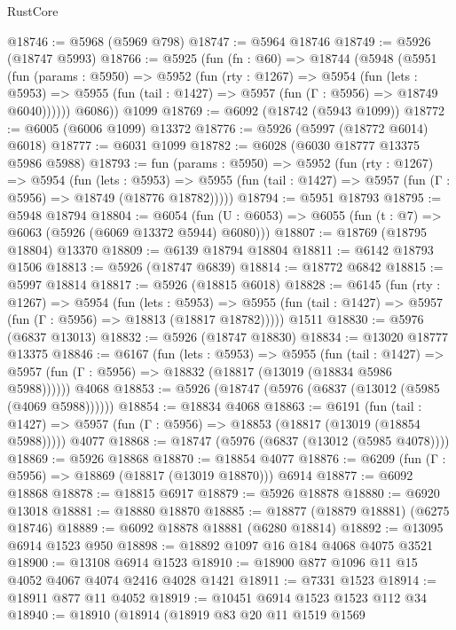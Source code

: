 \begin{lexlean}{RustCore}
\begin{coremodule}
@18746 := @5968 (@5969 @798)
@18747 := @5964 @18746
@18749 := @5926 (@18747 @5993)
@18766 := @5925
    (fun (fn : @60) =>
    @18744
      (@5948
        (@5951
          (fun (params : @5950) =>
          @5952
            (fun (rty : @1267) =>
            @5954
              (fun (lets : @5953) =>
              @5955 (fun (tail : @1427) => @5957 (fun (Γ : @5956) => @18749 @6040))))))
        @6086))
    @1099
@18769 := @6092 (@18742 (@5943 @1099))
@18772 := @6005 (@6006 @1099) @13372
@18776 := @5926 (@5997 (@18772 @6014) @6018)
@18777 := @6031 @1099
@18782 := @6028 (@6030 @18777 @13375 @5986 @5988)
@18793 := fun (params : @5950) =>
  @5952
    (fun (rty : @1267) =>
    @5954
      (fun (lets : @5953) =>
      @5955 (fun (tail : @1427) => @5957 (fun (Γ : @5956) => @18749 (@18776 @18782)))))
@18794 := @5951 @18793
@18795 := @5948 @18794
@18804 := @6054
    (fun (U : @6053) => @6055 (fun (t : @7) => @6063 (@5926 (@6069 @13372 @5944) @6080)))
@18807 := @18769 (@18795 @18804) @13370
@18809 := @6139 @18794 @18804
@18811 := @6142 @18793 @1506
@18813 := @5926 (@18747 @6839)
@18814 := @18772 @6842
@18815 := @5997 @18814
@18817 := @5926 (@18815 @6018)
@18828 := @6145
    (fun (rty : @1267) =>
    @5954
      (fun (lets : @5953) =>
      @5955 (fun (tail : @1427) => @5957 (fun (Γ : @5956) => @18813 (@18817 @18782)))))
    @1511
@18830 := @5976 (@6837 @13013)
@18832 := @5926 (@18747 @18830)
@18834 := @13020 @18777 @13375
@18846 := @6167
    (fun (lets : @5953) =>
    @5955
      (fun (tail : @1427) =>
      @5957 (fun (Γ : @5956) => @18832 (@18817 (@13019 (@18834 @5986 @5988))))))
    @4068
@18853 := @5926 (@18747 (@5976 (@6837 (@13012 (@5985 (@4069 @5988))))))
@18854 := @18834 @4068
@18863 := @6191
    (fun (tail : @1427) => @5957 (fun (Γ : @5956) => @18853 (@18817 (@13019 (@18854 @5988)))))
    @4077
@18868 := @18747 (@5976 (@6837 (@13012 (@5985 @4078))))
@18869 := @5926 @18868
@18870 := @18854 @4077
@18876 := @6209 (fun (Γ : @5956) => @18869 (@18817 (@13019 @18870))) @6914
@18877 := @6092 @18868
@18878 := @18815 @6917
@18879 := @5926 @18878
@18880 := @6920 @13018
@18881 := @18880 @18870
@18885 := @18877 (@18879 @18881) (@6275 @18746)
@18889 := @6092 @18878 @18881 (@6280 @18814)
@18892 := @13095 @6914 @1523 @950
@18898 := @18892 @1097 @16 @184 @4068 @4075 @3521
@18900 := @13108 @6914 @1523
@18910 := @18900 @877 @1096 @11 @15 @4052 @4067 @4074 @2416 @4028 @1421
@18911 := @7331 @1523
@18914 := @18911 @877 @11 @4052
@18919 := @10451 @6914 @1523 @1523 @112 @34
@18940 := @18910
    (@18914
      (@18919
        @83
        @20
        @11
        @1519
        @1569

\end{coremodule}
\end{lexlean}
